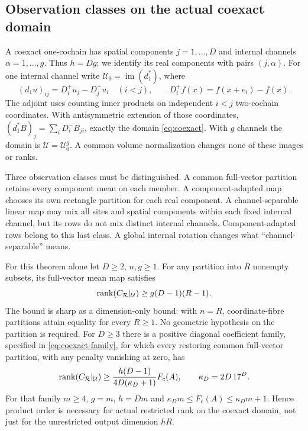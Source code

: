 \subsection{Observation classes on the actual coexact domain}\label{sec:classes-front}
A coexact one-cochain has spatial components $j=1,\ldots,D$ and internal
channels $\alpha=1,\ldots,g$. Thus $h=Dg$; we identify its real components
with pairs $(j,\alpha)$. For one internal channel write
$\mathcal U_0=\operatorname{im}(d_1^*)$, where
\[
 (d_1u)_{ij}=D_i^+u_j-D_j^+u_i\quad(i<j),\qquad
 D_i^+f(x)=f(x+e_i)-f(x).
\]
The adjoint uses counting inner products on independent $i<j$ two-cochain
coordinates. With antisymmetric extension of those coordinates,
$(d_1^*B)_j=\sum_iD_i^-B_{ji}$, exactly the domain
\eqref{eq:coexact}. With $g$ channels the domain is
$\mathcal U=\mathcal U_0^g$. A common volume normalization changes none of
these images or ranks.

Three observation classes must be distinguished. A common full-vector
partition retains every component mean on each member. A component-adapted
map chooses its own rectangle partition for each real component. A
channel-separable linear map may mix all sites and spatial components
within each fixed internal channel, but its rows do not mix distinct
internal channels. Component-adapted rows belong to this last class.
A global internal rotation changes what ``channel-separable'' means.

\begin{theorem}\label{thm:sharp-coexact}
For this theorem alone let $D\ge2$, $n,g\ge1$. For any partition into $R$
nonempty subsets, its full-vector mean map satisfies
\begin{equation}\label{eq:sharp-rank}
 \operatorname{rank}(C_{\mathcal R}|_{\mathcal U})\ge g(D-1)(R-1).
\end{equation}
The bound is sharp as a dimension-only bound: with $n=R$, coordinate-fibre
partitions attain equality for every $R\ge1$. No geometric hypothesis on
the partition is required.
For $D\ge3$ there is a positive diagonal coefficient family, specified in
\eqref{eq:coexact-family}, for which every restoring common full-vector
partition, with any penalty vanishing at zero, has
\begin{equation}\label{eq:coexact-product}
 \operatorname{rank}(C_{\mathcal R}|_{\mathcal U})
 \ge \frac{h(D-1)}{4D(\kappa_D+1)}F_c(A),\qquad
 \kappa_D=2D\,17^D.
\end{equation}
For that family $m\ge4$, $g=m$, $h=Dm$ and
$\kappa_Dm\le F_c(A)\le\kappa_Dm+1$. Hence product order is necessary
for actual restricted rank on the coexact domain, not just for the
unrestricted output dimension $hR$.
\end{theorem}

